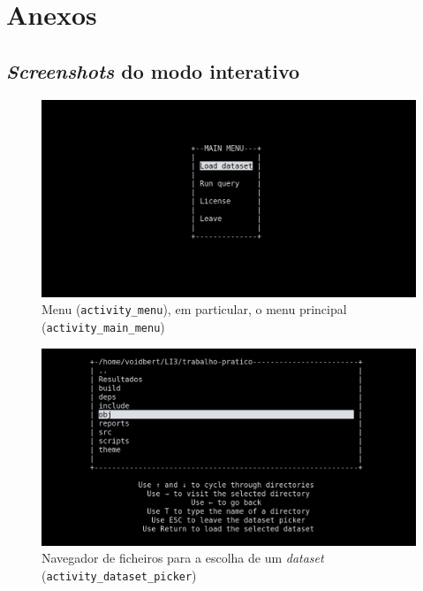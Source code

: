 \documentclass[11pt, a4paper]{article}
\begin{document}
\pagebreak
\section{Anexos}
\label{sec:annexes}

\subsection{\emph{Screenshots} do modo interativo}
\label{sec:interactive-screenshots}

\begin{figure}[H]
    \centering
    \includegraphics[scale=0.25]{res-fase2/interactive_screenshots/main_menu.png}
    \caption{Menu (\texttt{activity\_menu}), em particular, o menu principal
             (\texttt{activity\_main\_menu})}
    \label{fig:main_menu}
\end{figure}

\begin{figure}[H]
    \centering
    \includegraphics[scale=0.25]{res-fase2/interactive_screenshots/dataset_picker.png}
    \caption{Navegador de ficheiros para a escolha de um \emph{dataset}
             (\texttt{activity\_dataset\_picker})}
    \label{fig:dataset_picker}
\end{figure}
\end{document}
